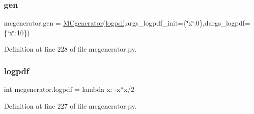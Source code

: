 \subsubsection{\texorpdfstring{gen}{gen}}
{\footnotesize\ttfamily mcgenerator.\+gen = \hyperlink{classmcgenerator_1_1MCgenerator}{M\+Cgenerator}(\hyperlink{namespacemcgenerator_a23bb8cafe013a76952e0a2e881d28c5a}{logpdf},args\+\_\+logpdf\+\_\+init=\{\char`\"{}x\char`\"{}\+:0\},dargs\+\_\+logpdf=\{\char`\"{}x\char`\"{}\+:10\})}



Definition at line 228 of file mcgenerator.\+py.

\mbox{\label{namespacemcgenerator_a23bb8cafe013a76952e0a2e881d28c5a}} 
\subsubsection{\texorpdfstring{logpdf}{logpdf}}
{\footnotesize\ttfamily int mcgenerator.\+logpdf = lambda x\+: -\/x$\ast$x/2}



Definition at line 227 of file mcgenerator.\+py.

